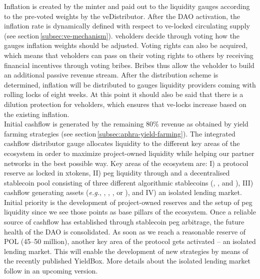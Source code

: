 Inflation is created by the \aphra minter and paid out to the liquidity gauges according to the pre-voted weights by the veDistributor.
After the DAO activation, the inflation rate is dynamically defined with respect to ve-locked circulating supply (see section\,\ref{subsec:ve-mechanism}).
ve\aphra holders decide through voting how the gauges inflation weights should be adjusted.
Voting rights can also be acquired, which means that ve\aphra holders can pass on their voting rights to others by receiving financial incentives through voting bribes.
Bribes thus allow the ve\aphra holder to build an additional passive revenue stream.
After the distribution scheme is determined, inflation will be distributed to gauges liquidity providers coming with rolling locks of eight weeks.
At this point it should also be said that there is a dilution protection for ve\aphra holders, which ensures that ve-locks increase based on the existing inflation.\\[-1em]

Initial cashflow is generated by the remaining 80\% revenue as obtained by \aphra yield farming strategies (see section\,\ref{subsec:aphra-yield-farming}).
The integrated cashflow distributor gauge allocates liquidity to the different key areas of the ecosystem in order to maximize project-owned liquidity while helping our partner networks in the best possible way.
Key areas of the ecosystem are: I) a protocol reserve as locked in x\vader tokens, II) peg liquidity through \crv and a decentralised stablecoin pool consisting of three different algorithmic stablecoins (\usdv,\cite{vader} \bean,\cite{bean} and \frax\cite{frax}), III) cashflow generating assets (\textit{e.g.}, \crv,\cite{curve} \fxs,\cite{frax} \rpl,\cite{rocket-pool} or \yfi\cite{yearn-finance}), and IV) an isolated lending market. 
Initial priority is the development of project-owned reserves and the setup of peg liquidity since we see those points as base pillars of the ecosystem.
Once a reliable source of cashflow has established through stablecoin peg arbitrage, the future health of the \aphra DAO is consolidated.
As soon as we reach a reasonable reserve of POL (45--50 million), another key area of the protocol gets activated -- an isolated lending market.
This will enable the development of new strategies by means of the recently published YieldBox.\cite{yieldbox,boringcrypto}
More details about the isolated lending market follow in an upcoming version.

